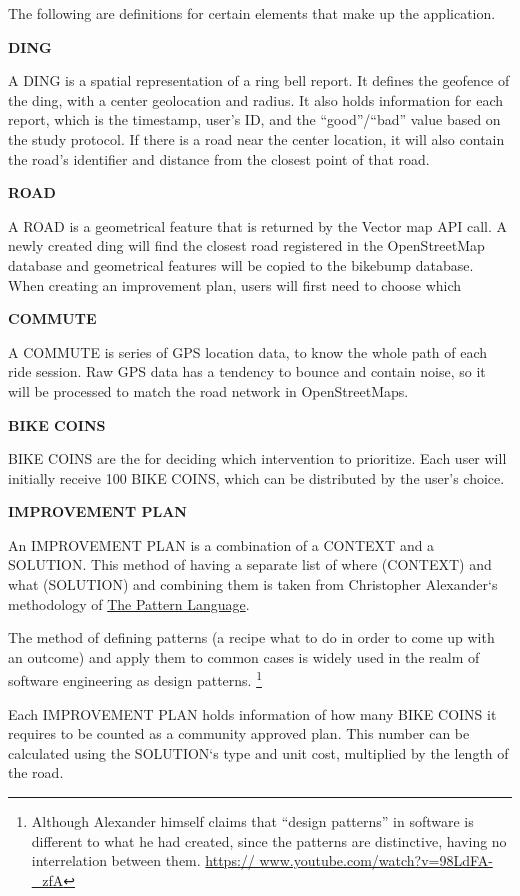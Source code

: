 The following are definitions for certain elements that make up the application.

\textbf{DING}

A DING is a spatial representation of a ring bell report. It defines the geofence of the ding, with a center geolocation and radius. It also holds information for each report, which is the timestamp, user's ID, and the ``good''/``bad'' value based on the study protocol. If there is a road near the center location, it will also contain the road's identifier and distance from the closest point of that road.

\textbf{ROAD}

A ROAD is a geometrical feature that is returned by the Vector map API call. A newly created ding will find the closest road registered in the OpenStreetMap database and geometrical features will be copied to the bikebump database. When creating an improvement plan, users will first need to choose which

\textbf{COMMUTE}

A COMMUTE is series of GPS location data, to know the whole path of each ride session. Raw GPS data has a tendency to bounce and contain noise, so it will be processed to match the road network in OpenStreetMaps.

\textbf{BIKE COINS}

BIKE COINS are the  for deciding which intervention to prioritize. Each user will initially receive 100 BIKE COINS, which can be distributed by the user's choice.

\textbf{IMPROVEMENT PLAN}

An IMPROVEMENT PLAN is a combination of a CONTEXT and a SOLUTION. This method of having a separate list of where (CONTEXT) and what (SOLUTION) and combining them is taken from Christopher Alexander‘s methodology of \underline{The Pattern Language}. \cite{alexander1977pattern}

The method of defining patterns (a recipe what to do in order to come up with an outcome) and apply them to common cases is widely used in the realm of software engineering as design patterns. 
\footnote{Although Alexander himself claims that “design patterns” in software is different to what he had created, since the patterns are distinctive, having no interrelation between them. \url{https:// www.youtube.com/watch?v=98LdFA-_zfA}
}

Each IMPROVEMENT PLAN holds information of how many BIKE COINS it requires to be counted as a community approved plan. This number can be calculated using the SOLUTION‘s type and unit cost, multiplied by the length of the road.

